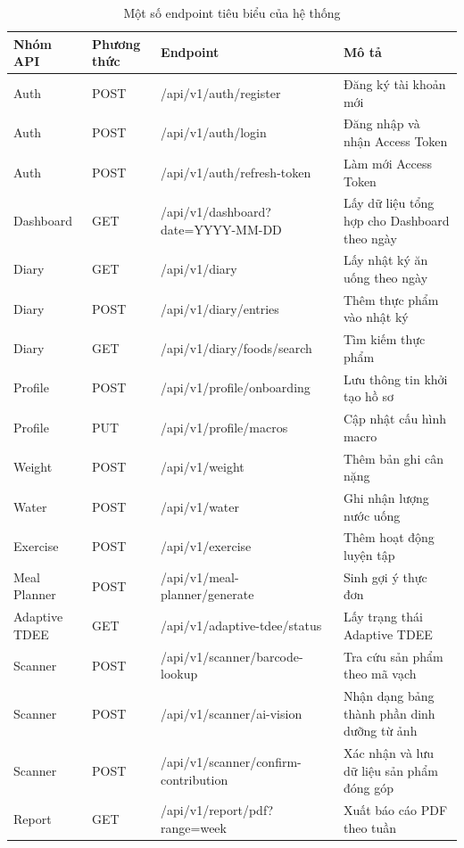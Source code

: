 \documentclass[12pt, a4paper]{report}
\begin{document}
\begin{table}[htbp]
\centering
\caption{Một số endpoint tiêu biểu của hệ thống}
\begin{tabular}{|p{3cm}|p{3cm}|p{4cm}|p{5cm}|}
\hline
\textbf{Nhóm API} & \textbf{Phương thức} & \textbf{Endpoint} & \textbf{Mô tả} \\
\hline
Auth & POST & /api/v1/auth/register & Đăng ký tài khoản mới \\
\hline
Auth & POST & /api/v1/auth/login & Đăng nhập và nhận Access Token \\
\hline
Auth & POST & /api/v1/auth/refresh-token & Làm mới Access Token \\
\hline
Dashboard & GET & /api/v1/dashboard?date=YYYY-MM-DD & Lấy dữ liệu tổng hợp cho Dashboard theo ngày \\
\hline
Diary & GET & /api/v1/diary & Lấy nhật ký ăn uống theo ngày \\
\hline
Diary & POST & /api/v1/diary/entries & Thêm thực phẩm vào nhật ký \\
\hline
Diary & GET & /api/v1/diary/foods/search & Tìm kiếm thực phẩm \\
\hline
Profile & POST & /api/v1/profile/onboarding & Lưu thông tin khởi tạo hồ sơ \\
\hline
Profile & PUT & /api/v1/profile/macros & Cập nhật cấu hình macro \\
\hline
Weight & POST & /api/v1/weight & Thêm bản ghi cân nặng \\
\hline
Water & POST & /api/v1/water & Ghi nhận lượng nước uống \\
\hline
Exercise & POST & /api/v1/exercise & Thêm hoạt động luyện tập \\
\hline
Meal Planner & POST & /api/v1/meal-planner/generate & Sinh gợi ý thực đơn \\
\hline
Adaptive TDEE & GET & /api/v1/adaptive-tdee/status & Lấy trạng thái Adaptive TDEE \\
\hline
Scanner & POST & /api/v1/scanner/barcode-lookup & Tra cứu sản phẩm theo mã vạch \\
\hline
Scanner & POST & /api/v1/scanner/ai-vision & Nhận dạng bảng thành phần dinh dưỡng từ ảnh \\
\hline
Scanner & POST & /api/v1/scanner/confirm-contribution & Xác nhận và lưu dữ liệu sản phẩm đóng góp \\
\hline
Report & GET & /api/v1/report/pdf?range=week & Xuất báo cáo PDF theo tuần \\
\hline
\end{tabular}
\end{table}
\end{document}
